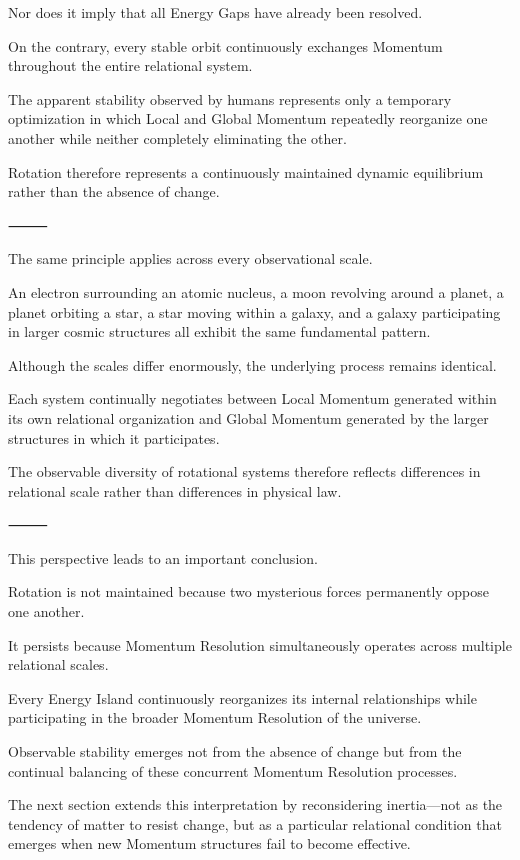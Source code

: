 Nor does it imply that all Energy Gaps have already been resolved.

On the contrary, every stable orbit continuously exchanges Momentum throughout the entire relational system.

The apparent stability observed by humans represents only a temporary optimization in which Local and Global Momentum repeatedly reorganize one another while neither completely eliminating the other.

Rotation therefore represents a continuously maintained dynamic equilibrium rather than the absence of change.

⸻

The same principle applies across every observational scale.

An electron surrounding an atomic nucleus, a moon revolving around a planet, a planet orbiting a star, a star moving within a galaxy, and a galaxy participating in larger cosmic structures all exhibit the same fundamental pattern.

Although the scales differ enormously, the underlying process remains identical.

Each system continually negotiates between Local Momentum generated within its own relational organization and Global Momentum generated by the larger structures in which it participates.

The observable diversity of rotational systems therefore reflects differences in relational scale rather than differences in physical law.

⸻

This perspective leads to an important conclusion.

Rotation is not maintained because two mysterious forces permanently oppose one another.

It persists because Momentum Resolution simultaneously operates across multiple relational scales.

Every Energy Island continuously reorganizes its internal relationships while participating in the broader Momentum Resolution of the universe.

Observable stability emerges not from the absence of change but from the continual balancing of these concurrent Momentum Resolution processes.

The next section extends this interpretation by reconsidering inertia—not as the tendency of matter to resist change, but as a particular relational condition that emerges when new Momentum structures fail to become effective.

